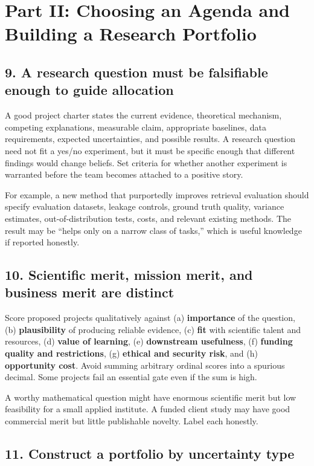 \section{Part II: Choosing an Agenda and Building a Research Portfolio}

\subsection{9. A research question must be falsifiable enough to guide allocation}

A good project charter states the current evidence, theoretical mechanism, competing explanations, measurable claim, appropriate baselines, data requirements, expected uncertainties, and possible results. A research question need not fit a yes/no experiment, but it must be specific enough that different findings would change beliefs. Set criteria for whether another experiment is warranted before the team becomes attached to a positive story.

For example, a new method that purportedly improves retrieval evaluation should specify evaluation datasets, leakage controls, ground truth quality, variance estimates, out-of-distribution tests, costs, and relevant existing methods. The result may be ``helps only on a narrow class of tasks,'' which is useful knowledge if reported honestly.

\subsection{10. Scientific merit, mission merit, and business merit are distinct}

Score proposed projects qualitatively against (a) \textbf{importance} of the question, (b) \textbf{plausibility} of producing reliable evidence, (c) \textbf{fit} with scientific talent and resources, (d) \textbf{value of learning}, (e) \textbf{downstream usefulness}, (f) \textbf{funding quality and restrictions}, (g) \textbf{ethical and security risk}, and (h) \textbf{opportunity cost}. Avoid summing arbitrary ordinal scores into a spurious decimal. Some projects fail an essential gate even if the sum is high.

A worthy mathematical question might have enormous scientific merit but low feasibility for a small applied institute. A funded client study may have good commercial merit but little publishable novelty. Label each honestly.

\subsection{11. Construct a portfolio by uncertainty type}

